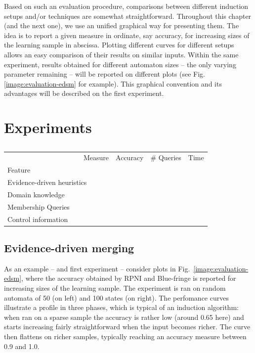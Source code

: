 Based on such an evaluation procedure, comparisons between different induction setups and/or techniques are somewhat straightforward. Throughout this chapter (and the next one), we use an unified graphical way for presenting them. The idea is to report a given measure in ordinate, say accuracy, for increasing sizes of the learning sample in abscissa. Plotting different curves for different setups allows an easy comparison of their results on similar inputs. Within the same experiment, results obtained for different automaton sizes -- the only varying parameter remaining -- will be reported on different plots (see Fig.\ref{image:evaluation-edsm} for example). This graphical convention and its advantages will be described on the first experiment.

\section{Experiments\label{section:evaluation-experiments}}

\begin{table}[h]
\small
\renewcommand{\arraystretch}{1.3}
\begin{center}
\begin{tabular}{| l || c | c | c |}
\hline
~~~~~~~~~~~~~~~~~~~~~~Measure & Accuracy &   \# Queries          &      Time      \\
Feature                       &          &                       &                \\
\hline
\hline
Evidence-driven heuristics    &          &                       &                \\
Domain knowledge              &          &                       &                \\
Membership Queries            &          & \cellcolor[gray]{0.7} &                \\
Control information           &          &                       &                \\
\hline
\end{tabular}
\end{center}
\caption{}
\end{table}

\subsection{Evidence-driven merging}

As an example -- and first experiment -- consider plots in Fig.~\ref{image:evaluation-edsm}, where the accuracy obtained by RPNI and Blue-fringe is reported for increasing sizes of the learning sample. The experiment is ran on random automata of 50 (on left) and 100 states (on right). The perfomance curves illustrate a profile in three phases, which is typical of an induction algorithm: when ran on a sparse sample the accuracy is rather low (around 0.65 here) and starts increasing fairly straightforward when the input becomes richer. The curve then flattens on richer samples, typically reaching an accuracy measure between 0.9 and 1.0. 

